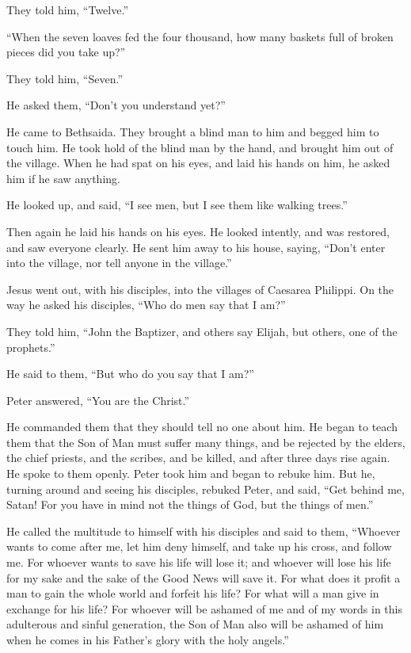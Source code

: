 They told him, ``Twelve.''

 ``When the seven loaves fed the four thousand, how many
baskets full of broken pieces did you take up?''

They told him, ``Seven.''

 He asked them, ``Don't you understand yet?''

 He came to Bethsaida. They brought a blind man to him and
begged him to touch him.  He took hold of the blind man by
the hand, and brought him out of the village. When he had spat on his
eyes, and laid his hands on him, he asked him if he saw anything.

 He looked up, and said, ``I see men, but I see them like
walking trees.''

 Then again he laid his hands on his eyes. He looked
intently, and was restored, and saw everyone clearly.  He
sent him away to his house, saying, ``Don't enter into the village, nor
tell anyone in the village.''

 Jesus went out, with his disciples, into the villages of
Caesarea Philippi. On the way he asked his disciples, ``Who do men say
that I am?''

 They told him, ``John the Baptizer, and others say Elijah,
but others, one of the prophets.''

 He said to them, ``But who do you say that I am?''

Peter answered, ``You are the Christ.''

 He commanded them that they should tell no one about him.
 He began to teach them that the Son of Man must suffer
many things, and be rejected by the elders, the chief priests, and the
scribes, and be killed, and after three days rise again. 
He spoke to them openly. Peter took him and began to rebuke him.
 But he, turning around and seeing his disciples, rebuked
Peter, and said, ``Get behind me, Satan! For you have in mind not the
things of God, but the things of men.''

 He called the multitude to himself with his disciples and
said to them, ``Whoever wants to come after me, let him deny himself,
and take up his cross, and follow me.  For whoever wants to
save his life will lose it; and whoever will lose his life for my sake
and the sake of the Good News will save it.  For what does
it profit a man to gain the whole world and forfeit his life?
 For what will a man give in exchange for his life?
 For whoever will be ashamed of me and of my words in this
adulterous and sinful generation, the Son of Man also will be ashamed of
him when he comes in his Father's glory with the holy angels.''


